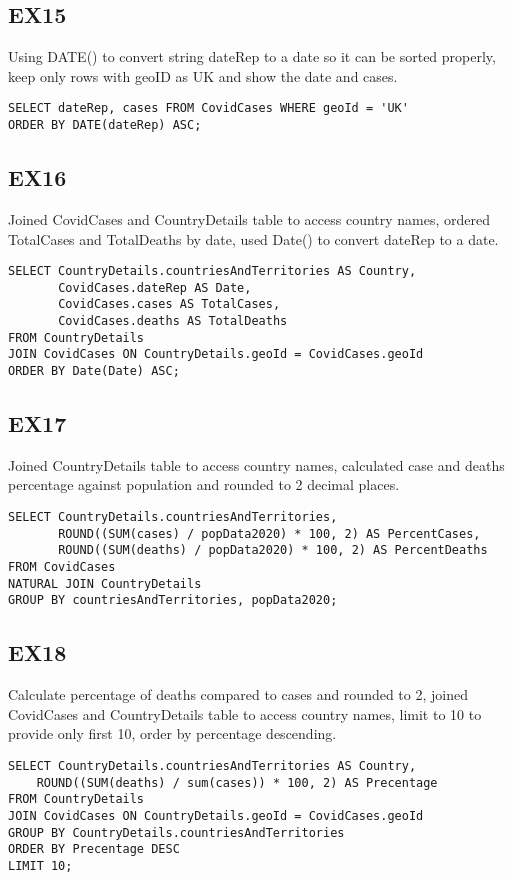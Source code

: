 \documentclass{article}
\begin{document}
\subsection{EX15}
Using DATE() to convert string dateRep to a date so it can be sorted properly, keep only rows with geoID as UK and show the date and cases.
\begin{verbatim}
SELECT dateRep, cases FROM CovidCases WHERE geoId = 'UK'
ORDER BY DATE(dateRep) ASC;
\end{verbatim}
\subsection{EX16}
Joined CovidCases and CountryDetails table to access country names, ordered TotalCases and TotalDeaths by date, used Date() to convert dateRep to a date.
\begin{verbatim}
SELECT CountryDetails.countriesAndTerritories AS Country,
       CovidCases.dateRep AS Date,
       CovidCases.cases AS TotalCases,
       CovidCases.deaths AS TotalDeaths
FROM CountryDetails
JOIN CovidCases ON CountryDetails.geoId = CovidCases.geoId
ORDER BY Date(Date) ASC;

\end{verbatim}
\subsection{EX17}
Joined CountryDetails table to access country names, calculated case and deaths percentage against population and rounded to 2 decimal places.
\begin{verbatim}
SELECT CountryDetails.countriesAndTerritories,
       ROUND((SUM(cases) / popData2020) * 100, 2) AS PercentCases,
       ROUND((SUM(deaths) / popData2020) * 100, 2) AS PercentDeaths
FROM CovidCases
NATURAL JOIN CountryDetails
GROUP BY countriesAndTerritories, popData2020;
\end{verbatim}
\subsection{EX18}
Calculate  percentage of deaths compared to cases and rounded to 2, joined CovidCases and CountryDetails table to access country names, limit to 10 to provide only first 10, order by percentage descending.
\begin{verbatim}
SELECT CountryDetails.countriesAndTerritories AS Country,
    ROUND((SUM(deaths) / sum(cases)) * 100, 2) AS Precentage
FROM CountryDetails
JOIN CovidCases ON CountryDetails.geoId = CovidCases.geoId
GROUP BY CountryDetails.countriesAndTerritories
ORDER BY Precentage DESC
LIMIT 10;
\end{verbatim}
\end{document}
